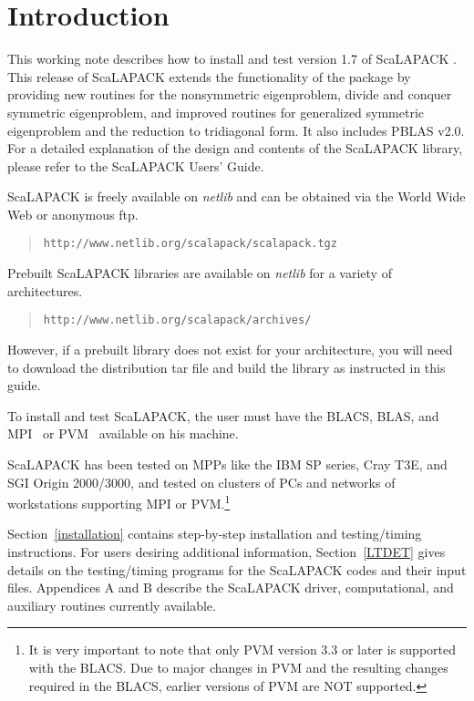 \documentclass[11pt]{report}
\newcommand{\dent}{\hspace*{\parindent}}
\begin{document}
\newpage

\tableofcontents

\newpage

\section{Introduction}

\vspace{0.25in}

\dent
This working note describes how to install and test
version 1.7 of ScaLAPACK \cite{slug}.
This release of ScaLAPACK extends the
functionality of the package by providing new routines for
the nonsymmetric eigenproblem, divide and conquer symmetric eigenproblem,
and improved routines for generalized symmetric eigenproblem and
the reduction to tridiagonal form.  It also includes PBLAS v2.0.
For a detailed explanation of the design and contents of the ScaLAPACK library,
please refer to the ScaLAPACK Users' Guide\cite{slug}.

ScaLAPACK is freely available on {\em netlib} and
can be obtained via the World Wide Web or anonymous ftp.
\begin{quote} 
{\tt http://www.netlib.org/scalapack/scalapack.tgz}
\end{quote}
Prebuilt ScaLAPACK libraries are available on {\em netlib} for a variety
of architectures.
\begin{quote} 
{\tt http://www.netlib.org/scalapack/archives/}
\end{quote}
However, if a prebuilt library does not exist
for your architecture, you will need to download the distribution tar
file and build the library as instructed in this guide.

To install and test ScaLAPACK, the user must have the 
BLACS, BLAS\cite{blas1,blas2,blas3}, and
MPI~\cite{mpi} or PVM~\cite{pvm} available on his machine.

ScaLAPACK has been tested on MPPs like the IBM SP series, Cray T3E,
and SGI Origin 2000/3000, and tested on clusters of PCs and networks of 
 workstations supporting
MPI or PVM.\footnote{It is very important to note that only PVM version
3.3 or later is supported with the BLACS\cite{lawn94,lawn73}.  Due to
major changes
in PVM and the resulting changes required in the BLACS,
earlier versions of PVM are NOT supported.}

Section~\ref{installation} contains step-by-step installation and
testing/timing instructions.  For users desiring additional information,
Section~\ref{LTDET} gives details on the testing/timing programs for the
ScaLAPACK codes and their input files.
Appendices A and B describe the ScaLAPACK driver, computational, and
auxiliary routines currently available.
\end{document}
